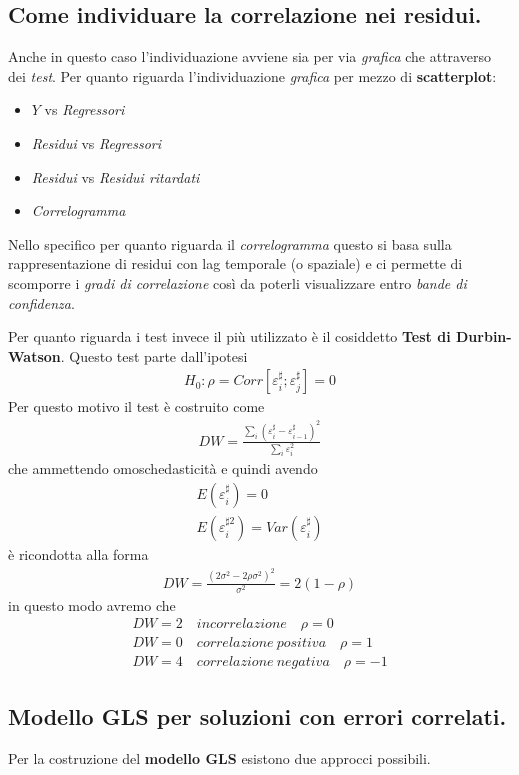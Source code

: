 \documentclass[11pt, twocolumn]{article}
\begin{document}
\subsection*{Come individuare la correlazione nei residui.}
Anche in questo caso l'individuazione avviene sia per via \textit{grafica} che attraverso dei \textit{test}.
Per quanto riguarda l'individuazione \textit{grafica} per mezzo di \textbf{scatterplot}:
\begin{itemize}
\item $Y$ vs \textit{Regressori}
\item \textit{Residui} vs \textit{Regressori}
\item \textit{Residui} vs \textit{Residui ritardati}
\item \textit{Correlogramma}
\end{itemize}
Nello specifico per quanto riguarda il \textit{correlogramma} questo si basa sulla rappresentazione di residui con lag temporale (o spaziale) e ci permette di scomporre i \textit{gradi di correlazione} così da poterli visualizzare entro \textit{bande di confidenza}.

Per quanto riguarda i test invece il più utilizzato è il cosiddetto \textbf{Test di Durbin-Watson}. Questo test parte dall'ipotesi
\begin{align*}
H_0 : \rho = Corr [\varepsilon_i^\sharp;\varepsilon_j^\sharp] = 0
\end{align*}
Per questo motivo il test è costruito come
\begin{align*}
DW = \frac{\sum_i(\varepsilon_i^\sharp - \varepsilon_{i-1}^\sharp)^2}{\sum_i\varepsilon_i^2}
\end{align*}
che ammettendo omoschedasticità e quindi avendo
\begin{align*}
E(\varepsilon_i^\sharp) = 0 \\
E(\varepsilon_i^{\sharp2}) = Var(\varepsilon_i^\sharp)
\end{align*}
è ricondotta alla forma
\begin{align*}
DW = \frac{(2\sigma^2 - 2\rho\sigma^2)^2}{\sigma^2} = 2(1-\rho)
\end{align*}
in questo modo avremo che
\begin{align*}
DW = 2 \quad incorrelazione \quad  \rho = 0\\
DW = 0 \quad correlazione \  positiva \quad \rho = 1\\
DW = 4 \quad correlazione \  negativa \quad \rho = -1
\end{align*}
\subsection*{Modello GLS per soluzioni con errori correlati.}
Per la costruzione del \textbf{ modello GLS} esistono due approcci possibili.
\end{document}
